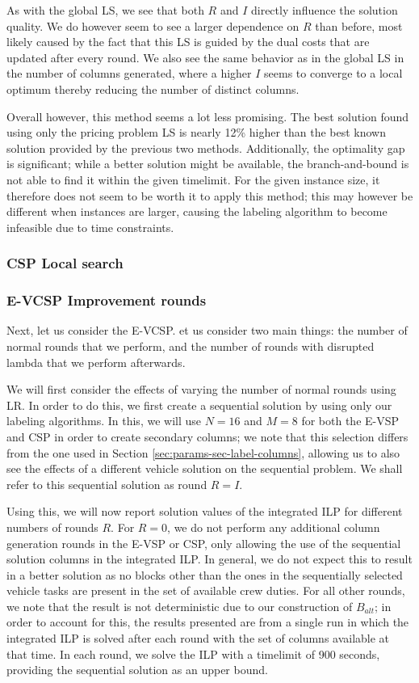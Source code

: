 \documentclass[]{article}
\begin{document}
As with the global LS, we see that both $R$ and $I$ directly influence the solution quality. We do however seem to see a larger dependence on $R$ than before, most likely caused by the fact that this LS is guided by the dual costs that are updated after every round. We also see the same behavior as in the global LS in the number of columns generated, where a higher $I$ seems to converge to a local optimum thereby reducing the number of distinct columns. 

Overall however, this method seems a lot less promising. The best solution found using only the pricing problem LS is nearly 12\% higher than the best known solution provided by the previous two methods. Additionally, the optimality gap is significant; while a better solution might be available, the branch-and-bound is not able to find it within the given timelimit. For the given instance size, it therefore does not seem to be worth it to apply this method; this may however be different when instances are larger, causing the labeling algorithm to become infeasible due to time constraints. 

\subsubsection{CSP Local search}

\subsubsection{E-VCSP Improvement rounds}
Next, let us consider the E-VCSP.   et us consider two main things: the number of normal rounds that we perform, and the number of rounds with disrupted lambda that we perform afterwards. 

We will first consider the effects of varying the number of normal rounds using LR. In order to do this, we first create a sequential solution by using only our labeling algorithms. In this, we will use $N=16$ and $M=8$ for both the E-VSP and CSP in order to create secondary columns; we note that this selection differs from the one used in Section \ref{sec:params-sec-label-columns}, allowing us to also see the effects of a different vehicle solution on the sequential problem.  We shall refer to this sequential solution as round $R = I$.

Using this, we will now report solution values of the integrated ILP for different numbers of rounds $R$. For $R=0$, we do not perform any additional column generation rounds in the E-VSP or CSP, only allowing the use of the sequential solution columns in the integrated ILP. In general, we do not expect this to result in a better solution as no blocks other than the ones in the sequentially selected vehicle tasks are present in the set of available crew duties. For all other rounds, we note that the result is not deterministic due to our construction of $B_{alt}$; in order to account for this, the results presented are from a single run in which the integrated ILP is solved after each round with the set of columns available at that time. In each round, we solve the ILP with a timelimit of 900 seconds, providing the sequential solution as an upper bound.
\end{document}
